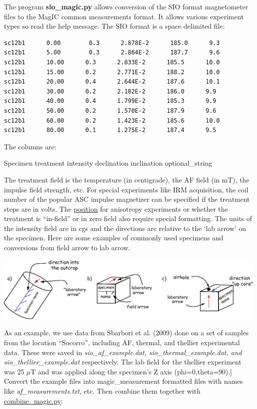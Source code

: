 \documentclass[11pt]{book}
\begin{document}
{{{The program {\bf sio\_magic.py} allows conversion of the SIO format magnetometer files to the MagIC common measurements format.    It allows various experiment types so read the help message.    The SIO format is a space delimited file:


\begin{verbatim}
sc12b1      0.00        0.3      2.878E-2      185.0      9.3
sc12b1      5.00        0.3      2.864E-2      187.7      9.6
sc12b1      10.00      0.3      2.833E-2      185.5      10.0
sc12b1      15.00      0.2      2.771E-2      188.2      10.0
sc12b1      20.00      0.4      2.644E-2      187.6      10.1
sc12b1      30.00      0.2      2.182E-2      186.0      9.9
sc12b1      40.00      0.4      1.799E-2      185.3      9.9
sc12b1      50.00      0.2      1.570E-2      187.9      9.6
sc12b1      60.00      0.2      1.423E-2      185.6      10.0
sc12b1      80.00      0.1      1.275E-2      187.4      9.5
\end{verbatim}

The columns are: 

Specimen    treatment   intensity   declination   inclination   optional\_string


The treatment field is the temperature (in centigrade), the AF field (in mT), the impulse field  strength, etc.  For special experiments like IRM acquisition, the  coil number of the popular ASC impulse magnetizer can be specified if the treatment steps are in volts.  The \href{#k15_magic.py}{position} for anisotropy experiments or whether the treatment is ``in-field'' or in zero field also require special formatting.  The units of the intensity field are in cgs and the directions are relative to the `lab arrow' on the specimen.  Here are some examples of commonly used specimens and conversions from field arrow to lab arrow.  

\includegraphics[width=15cm]{EPSfiles/samples.eps} 




As an example, we use data from Sbarbori et al. (2009) \nocite{sbarbori09} done on a set of samples  from the location ``Socorro'', including AF, thermal,  and thellier experimental data.  These were saved in {\it sio\_af\_example.dat, sio\_thermal\_example.dat, and sio\_thellier\_example.dat} respectively.  The lab field for the thellier experiment was 25 $\mu$T and was applied along the specimen's Z axis (phi=0,theta=90).] 
   Convert the example files  into magic\_measurement formatted files with names like
    {\it af\_measurements.txt}, etc.    Then combine them together with \href{#combine_magic}{combine\_magic.py}:   

}}}
\end{document}

